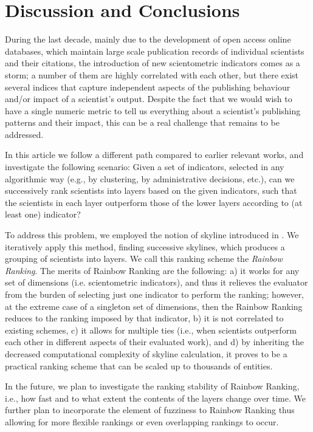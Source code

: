 \section{Discussion and Conclusions}\label{discussion-and-conclusions}

During the last decade, mainly due to the development of open access
online databases, which maintain large scale publication records of
individual scientists and their citations, the introduction of new
scientometric indicators comes as a storm; a number of them are highly
correlated with each other, but there exist several indices that capture
independent aspects of the publishing behaviour and/or impact of a
scientist's output. Despite the fact that we would wish to have a single
numeric metric to tell us everything about a scientist's publishing
patterns and their impact, this can be a real challenge that remains to
be addressed.

In this article we follow a different path compared to earlier relevant
works, and investigate the following scenario: Given a set of
indicators, selected in any algorithmic way (e.g., by clustering, by
administrative decisions, etc.), can we successively rank scientists
into layers based on the given indicators, such that the scientists in
each layer outperform those of the lower layers according to (at least
one) indicator?

To address this problem, we employed the notion of skyline introduced in
. We iteratively apply this method, finding successive skylines, which
produces a grouping of scientists into layers. We call this ranking
scheme the \emph{Rainbow Ranking}. The merits of Rainbow Ranking are the
following: a) it works for any set of dimensions (i.e. scientometric
indicators), and thus it relieves the evaluator from the burden of
selecting just one indicator to perform the ranking; however, at the
extreme case of a singleton set of dimensions, then the Rainbow Ranking
reduces to the ranking imposed by that indicator, b) it is not
correlated to existing schemes, c) it allows for multiple ties (i.e.,
when scientists outperform each other in different aspects of their
evaluated work), and d) by inheriting the decreased computational
complexity of skyline calculation, it proves to be a practical ranking
scheme that can be scaled up to thousands of entities.

In the future, we plan to investigate the ranking stability of Rainbow
Ranking, i.e., how fast and to what extent the contents of the layers
change over time. We further plan to incorporate the element of
fuzziness to Rainbow Ranking thus allowing for more flexible rankings or
even overlapping rankings to occur.